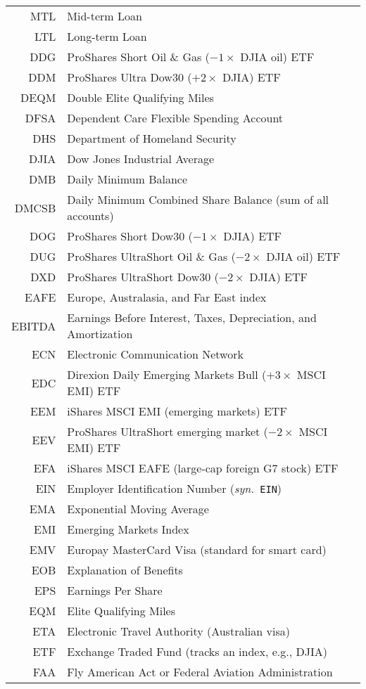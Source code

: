 \documentclass[12pt,twoside]{article}
\newcommand{\syn}[1]{(\textit{syn.}~\texttt{#1})}
\begin{document}
\begin{longtable}[>{\bfseries}l]{>{\ttfamily}r l}
MTL & Mid-term Loan \\
LTL & Long-term Loan \\
DDG & ProShares Short Oil \& Gas ($-1 \times$ DJIA oil) ETF \\
DDM & ProShares Ultra Dow30 ($+2 \times$ DJIA) ETF \\
DEQM & Double Elite Qualifying Miles \\
DFSA & Dependent Care Flexible Spending Account \\
DHS & Department of Homeland Security \\
DJIA & Dow Jones Industrial Average \\
DMB & Daily Minimum Balance \\
DMCSB & Daily Minimum Combined Share Balance (sum of all accounts) \\
DOG & ProShares Short Dow30 ($-1 \times$ DJIA) ETF \\
DUG & ProShares UltraShort Oil \& Gas ($-2 \times$ DJIA oil) ETF \\
DXD & ProShares UltraShort Dow30 ($-2 \times$ DJIA) ETF \\
EAFE & Europe, Australasia, and Far East index \\
EBITDA & Earnings Before Interest, Taxes, Depreciation, and Amortization \\
ECN & Electronic Communication Network \\
EDC & Direxion Daily Emerging Markets Bull ($+3 \times$ MSCI EMI) ETF \\
EEM & iShares MSCI EMI (emerging markets) ETF \\
EEV & ProShares UltraShort emerging market ($-2 \times$ MSCI EMI) ETF \\
EFA & iShares MSCI EAFE (large-cap foreign G7 stock) ETF \\
EIN & Employer Identification Number \syn{EIN} \\
EMA & Exponential Moving Average \\
EMI & Emerging Markets Index \\
EMV & Europay MasterCard Visa (standard for smart card) \\
EOB & Explanation of Benefits \\
EPS & Earnings Per Share \\
EQM & Elite Qualifying Miles \\
ETA & Electronic Travel Authority (Australian visa) \\
ETF & Exchange Traded Fund (tracks an index, e.g., DJIA) \\
FAA & Fly American Act or Federal Aviation Administration \\

\end{longtable}
\end{document}
